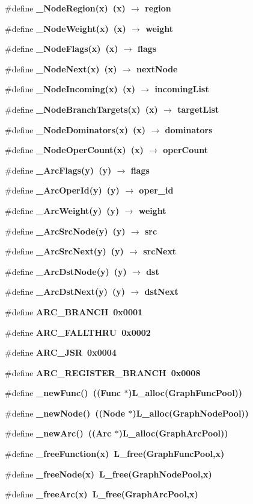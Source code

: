 \begin{CompactItemize}
\item 
\#define \bf{\_\-Node\-Region}(x)~(x) $\rightarrow$ \bf{region}
\item 
\#define \bf{\_\-Node\-Weight}(x)~(x) $\rightarrow$ weight
\item 
\#define \bf{\_\-Node\-Flags}(x)~(x) $\rightarrow$ flags
\item 
\#define \bf{\_\-Node\-Next}(x)~(x) $\rightarrow$ \bf{next\-Node}
\item 
\#define \bf{\_\-Node\-Incoming}(x)~(x) $\rightarrow$ incoming\-List
\item 
\#define \bf{\_\-Node\-Branch\-Targets}(x)~(x) $\rightarrow$ target\-List
\item 
\#define \bf{\_\-Node\-Dominators}(x)~(x) $\rightarrow$ dominators
\item 
\#define \bf{\_\-Node\-Oper\-Count}(x)~(x) $\rightarrow$ oper\-Count
\item 
\#define \bf{\_\-Arc\-Flags}(y)~(y) $\rightarrow$ flags
\item 
\#define \bf{\_\-Arc\-Oper\-Id}(y)~(y) $\rightarrow$ oper\_\-id
\item 
\#define \bf{\_\-Arc\-Weight}(y)~(y) $\rightarrow$ weight
\item 
\#define \bf{\_\-Arc\-Src\-Node}(y)~(y) $\rightarrow$ src
\item 
\#define \bf{\_\-Arc\-Src\-Next}(y)~(y) $\rightarrow$ src\-Next
\item 
\#define \bf{\_\-Arc\-Dst\-Node}(y)~(y) $\rightarrow$ dst
\item 
\#define \bf{\_\-Arc\-Dst\-Next}(y)~(y) $\rightarrow$ dst\-Next
\item 
\#define \bf{ARC\_\-BRANCH}~0x0001
\item 
\#define \bf{ARC\_\-FALLTHRU}~0x0002
\item 
\#define \bf{ARC\_\-JSR}~0x0004
\item 
\#define \bf{ARC\_\-REGISTER\_\-BRANCH}~0x0008
\item 
\#define \bf{\_\-new\-Func}()~((\bf{Func} $\ast$)\bf{L\_\-alloc}(\bf{Graph\-Func\-Pool}))
\item 
\#define \bf{\_\-new\-Node}()~((\bf{Node} $\ast$)\bf{L\_\-alloc}(\bf{Graph\-Node\-Pool}))
\item 
\#define \bf{\_\-new\-Arc}()~((\bf{Arc} $\ast$)\bf{L\_\-alloc}(\bf{Graph\-Arc\-Pool}))
\item 
\#define \bf{\_\-free\-Function}(x)~\bf{L\_\-free}(\bf{Graph\-Func\-Pool},x)
\item 
\#define \bf{\_\-free\-Node}(x)~\bf{L\_\-free}(\bf{Graph\-Node\-Pool},x)
\item 
\#define \bf{\_\-free\-Arc}(x)~\bf{L\_\-free}(\bf{Graph\-Arc\-Pool},x)
\end{CompactItemize}
